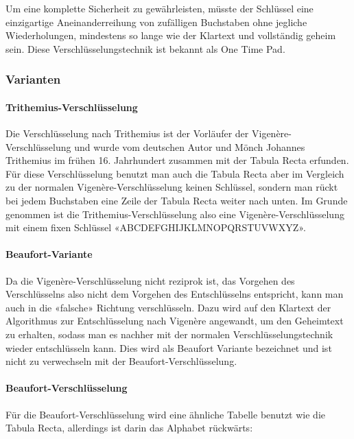 Um eine komplette Sicherheit zu gewährleisten, müsste der Schlüssel eine einzigartige Aneinanderreihung von zufälligen Buchstaben ohne jegliche Wiederholungen, mindestens so lange wie der Klartext und vollständig geheim sein. Diese Verschlüsselungstechnik ist bekannt als One Time Pad.


\subsubsection{Varianten}
\label{sec:v-varianten}

\paragraph{Trithemius-Verschlüsselung}
\label{sec:v-trithemius}
Die Verschlüsselung nach Trithemius ist der Vorläufer der Vigenère-Verschlüsselung und wurde vom deutschen Autor und Mönch Johannes Trithemius im frühen 16. Jahrhundert zusammen mit der Tabula Recta erfunden. Für diese Verschlüsselung benutzt man auch die Tabula Recta aber im Vergleich zu der normalen Vigenère-Verschlüsselung keinen Schlüssel, sondern man rückt bei jedem Buchstaben eine Zeile der Tabula Recta weiter nach unten. Im Grunde genommen ist die Trithemius-Verschlüsselung also eine Vigenère-Verschlüsselung mit einem fixen Schlüssel «ABCDEFGHIJKLMNOPQRSTUVWXYZ».

\paragraph{Beaufort-Variante}
\label{sec:v-beaufort-var}
Da die Vigenère-Verschlüsselung nicht reziprok ist, das Vorgehen des Verschlüsselns also nicht dem Vorgehen des Entschlüsselns entspricht, kann man auch in die «falsche» Richtung verschlüsseln. Dazu wird auf den Klartext der Algorithmus zur Entschlüsselung nach Vigenère angewandt, um den Geheimtext zu erhalten, sodass man es nachher mit der normalen Verschlüsselungstechnik wieder entschlüsseln kann. Dies wird als Beaufort Variante bezeichnet und ist nicht zu verwechseln mit der Beaufort-Verschlüsselung.

\paragraph{Beaufort-Verschlüsselung}
\label{sec:v-beaufort-verschluesselung}
Für die Beaufort-Verschlüsselung wird eine ähnliche Tabelle benutzt wie die Tabula Recta, allerdings ist darin das Alphabet rückwärts:

